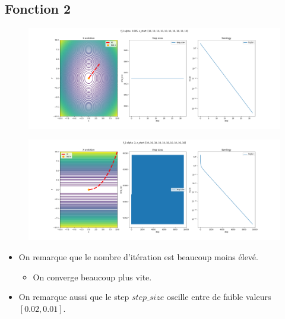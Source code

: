 \documentclass[twoside,10pt,a4paper]{article}
\numberwithin{equation}{section}					%
\numberwithin{figure}{section}						%
\begin{document}
\subsection{Fonction 2 }\label{sec:subsection2}
\begin{figure}[H]
    \centering
    \includegraphics[width=\textwidth]{imgs/adaptatif_sz/f_2_a-0.005_adaptatif.png}
    \caption{}
\end{figure}
\begin{figure}[H]
    \centering
    \includegraphics[width=\textwidth]{imgs/adaptatif_sz/f_2_a-3_adaptatif.png}
    \caption{}
\end{figure}
\begin{itemize}
	\item On remarque que le nombre d'itération est beaucoup moins élevé.
	\begin{itemize}
    	\item On converge beaucoup plus vite.
	\end{itemize}
	\item On remarque aussi que le step $step\_size$ oscille entre de faible valeurs $[0.02, 0.01]$.
\end{itemize}
\end{document}
